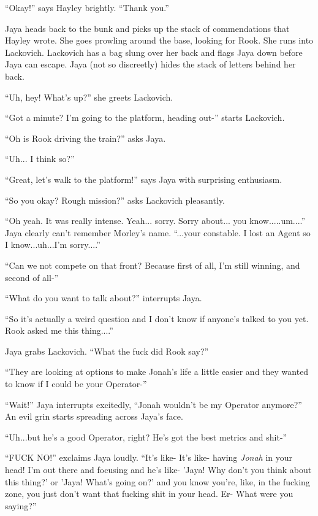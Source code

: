 ``Okay!'' says Hayley brightly.  ``Thank you.''





Jaya heads back to the bunk and picks up the stack of commendations that Hayley wrote.  She goes prowling around the base, looking for Rook.  She runs into Lackovich.  Lackovich has a bag slung over her back and flags Jaya down before Jaya can escape.  Jaya (not so discreetly) hides the stack of letters behind her back.

``Uh, hey!  What's up?'' she greets Lackovich.

``Got a minute?  I'm going to the platform, heading out-'' starts Lackovich.

``Oh is Rook driving the train?'' asks Jaya.

``Uh... I think so?''

``Great, let's walk to the platform!'' says Jaya with surprising enthusiasm.

``So you okay?  Rough mission?'' asks Lackovich pleasantly.

``Oh yeah.  It was really intense.  Yeah... sorry.  Sorry about... you know.....um....'' Jaya clearly can't remember Morley's name. ``...your constable.   I lost an Agent so I know...uh...I'm sorry....''

``Can we not compete on that front? Because first of all, I'm still winning, and second of all-''

``What do you want to talk about?'' interrupts Jaya.

``So it's actually a weird question and I don't know if anyone's talked to you yet.  Rook asked me this thing....''

Jaya grabs Lackovich. ``What the fuck did Rook say?'' 

``They are looking at options to make Jonah's life a little easier and they wanted to know if I could be your Operator-''

``Wait!'' Jaya interrupts excitedly, ``Jonah wouldn't be my Operator anymore?''  An evil grin starts spreading across Jaya's face.

``Uh...but he's a good Operator, right?  He's got the best metrics and shit-''

``FUCK NO!'' exclaims Jaya loudly.  ``It's like- It's like- having \textit{Jonah} in your head!  I'm out there and focusing and he's like- 'Jaya! Why don't you think about this thing?' or 'Jaya!  What's going on?' and you know you're, like, in the fucking zone, you just don't want that fucking shit in your head.  Er- What were you saying?''

